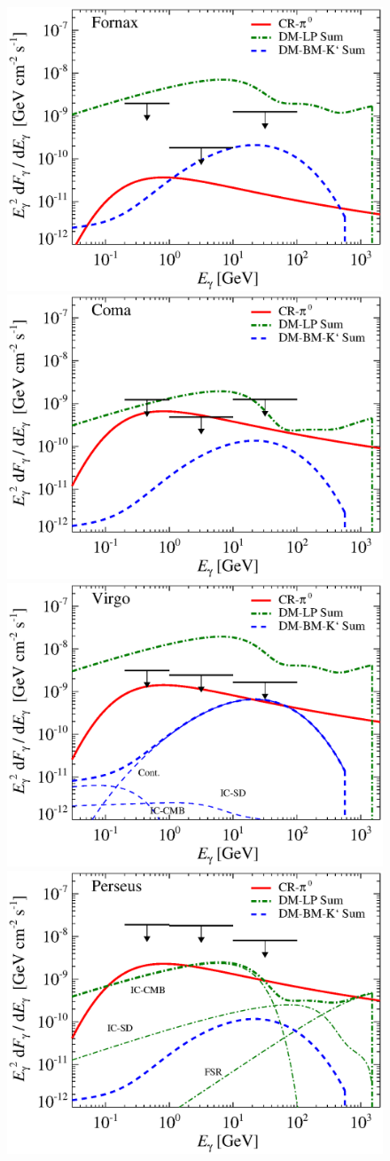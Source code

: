 \documentclass[10pt,aps,pra,reprint,amsmath,amsfonts,amssymb,showpacs]{revtex4-1}
\begin{document}
\begin{figure}
\begin{minipage}{2.0\columnwidth}
 \includegraphics[width=0.49\columnwidth]{figures/flux.cluster.Fornax.v10.0.1deg.1.6T.SubMass.SF300.IR2.noMW.woGal.eps}
\includegraphics[width=0.49\columnwidth]{figures/flux.cluster.Coma.v10.0.1deg.1.6T.SubMass.SF300.IR2.noMW.woGal.eps}
\includegraphics[width=0.49\columnwidth]{figures/flux.cluster.Virgo.v10.0.1deg.1.6T.SubMass.SF300.IR2.noMW.woGal.eps}
\includegraphics[width=0.49\columnwidth]{figures/flux.cluster.Perseus.v10.0.1deg.1.6T.SubMass.SF300.IR2.noMW.woGal.eps}

\end{minipage}
\end{figure}
\end{document}
